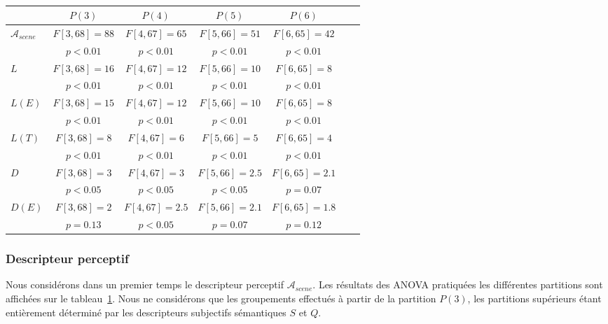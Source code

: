 \begin{table}[t]
\centering
\begin{tabular}{lcccccc}
                      & $P(3)$       & $P(4)$        & $P(5)$        & $P(6)$  \\
\hline
$\mathcal{A}_{scene}$ & $F[3,68]=88$ & $F[4,67]=65$  & $F[5,66]=51$  & $F[6,65]=42$  \\
                      & $p<0.01$     & $p<0.01$      & $p<0.01$      & $p<0.01$   \\
$L$                   & $F[3,68]=16$ & $F[4,67]=12$  & $F[5,66]=10$  & $F[6,65]=8$  \\
                      & $p<0.01$     & $p<0.01$      & $p<0.01$      & $p<0.01$   \\
$L(E)$                & $F[3,68]=15$ & $F[4,67]=12$  & $F[5,66]=10$  & $F[6,65]=8$  \\
                      & $p<0.01$     & $p<0.01$      & $p<0.01$      & $p<0.01$   \\
$L(T)$                & $F[3,68]=8$  & $F[4,67]=6$   & $F[5,66]=5$   & $F[6,65]=4$   \\
                      & $p<0.01$     & $p<0.01$      & $p<0.01$      & $p<0.01$   \\
$D$                   & $F[3,68]=3$  & $F[4,67]=3$   & $F[5,66]=2.5$ & $F[6,65]=2.1$  \\
                      & $p<0.05$     & $p<0.05$      & $p<0.05$      & $p=0.07$   \\
$D(E)$                & $F[3,68]=2$  & $F[4,67]=2.5$ & $F[5,66]=2.1$ & $F[6,65]=1.8$  \\
                      & $p=0.13$     & $p<0.05$      & $p=0.07$      & $p=0.12$   \\
\hline
\end{tabular}
\vspace{0.5mm}
\caption{}
\label{tab:ANOVAhac}
\end{table}

\subsubsection{Descripteur perceptif}

Nous considérons dans un premier temps le descripteur perceptif $\mathcal{A}_{scene}$. Les résultats des ANOVA pratiquées les différentes partitions sont affichées sur le tableau~\ref{tab:ANOVAhac}. Nous ne considérons que les groupements effectués à partir de la partition $P(3)$, les partitions supérieurs étant entièrement déterminé par les descripteurs subjectifs sémantiques $S$ et $Q$. 

